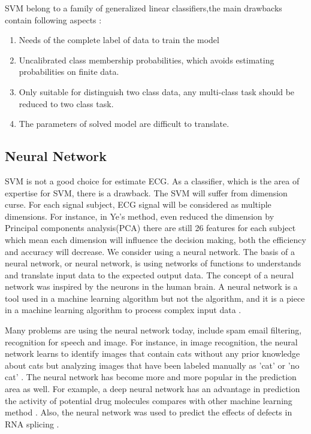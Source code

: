 \documentclass[a4paper,12pt]{article}
\begin{document}
SVM belong to a family of generalized linear classifiers,the main drawbacks contain following aspects \autocite{wiki:svm}:
\begin{enumerate}
    \item Needs of the complete label of data to train the model
    \item Uncalibrated class membership probabilities, which avoids estimating probabilities on finite data.
    \item Only suitable for distinguish two class data, any multi-class task should be reduced to two class task. 
    \item The parameters of solved model are difficult to translate.
\end{enumerate}

\subsection{Neural Network}
SVM is not a good choice for estimate ECG. As a classifier, which is the area of expertise for SVM, there is a drawback. The SVM will suffer from dimension curse. For each signal subject, ECG signal will be considered as multiple dimensions. For instance, in Ye's method\autocite{Ye:2012heartbeat}, even reduced the dimension by Principal components analysis(PCA) there are still 26 features for each subject which mean each dimension will influence the decision making, both the efficiency and accuracy will decrease. We consider using a neural network. The basis of a neural network, or neural network, is using networks of functions to understands and translate input data to the expected output data. The concept of a neural network was inspired by the neurons in the human brain. A neural network is a tool used in a machine learning algorithm but not the algorithm, and it is a piece in a machine learning algorithm to process complex input data \autocite{Build_with_ai:deepai_2019}. 

Many problems are using the neural network today, include spam email filtering, recognition for speech and image. For instance, in image recognition, the neural network learns to identify images that contain cats without any prior knowledge about cats but analyzing images that have been labeled manually as 'cat' or 'no cat' \autocite{wiki:neuralnetwork}. The neural network has become more and more popular in the prediction area as well. For example, a deep neural network has an advantage in prediction the activity of potential drug molecules compares with other machine learning method \autocite{Ma:2015deep}. Also, the neural network was used to predict the effects of defects in RNA splicing \autocite{Xiong:2015human}.
\end{document}
